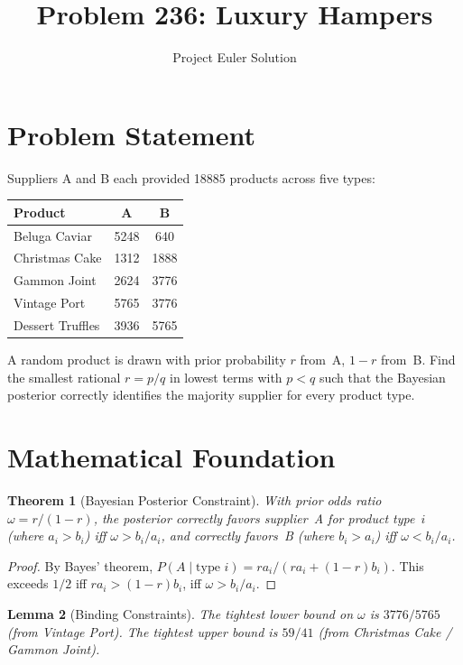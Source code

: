 \documentclass[12pt]{article}
\title{Problem 236: Luxury Hampers}
\author{Project Euler Solution}
\date{}
\newtheorem{theorem}{Theorem}
\newtheorem{lemma}[theorem]{Lemma}
\begin{document}
\maketitle

\section{Problem Statement}
Suppliers A and B each provided 18885 products across five types:

\begin{center}
\begin{tabular}{|l|c|c|}
\hline
Product & A & B \\
\hline
Beluga Caviar & 5248 & 640 \\
Christmas Cake & 1312 & 1888 \\
Gammon Joint & 2624 & 3776 \\
Vintage Port & 5765 & 3776 \\
Dessert Truffles & 3936 & 5765 \\
\hline
\end{tabular}
\end{center}

A random product is drawn with prior probability $r$ from~A, $1{-}r$ from~B. Find the smallest rational $r = p/q$ in lowest terms with $p < q$ such that the Bayesian posterior correctly identifies the majority supplier for every product type.

\section{Mathematical Foundation}

\begin{theorem}[Bayesian Posterior Constraint]
With prior odds ratio $\omega = r/(1-r)$, the posterior correctly favors supplier~A for product type~$i$ (where $a_i > b_i$) iff $\omega > b_i/a_i$, and correctly favors~B (where $b_i > a_i$) iff $\omega < b_i/a_i$.
\end{theorem}

\begin{proof}
By Bayes' theorem, $P(A \mid \text{type } i) = r a_i / (r a_i + (1-r)b_i)$. This exceeds $1/2$ iff $r a_i > (1-r)b_i$, iff $\omega > b_i/a_i$.
\end{proof}

\begin{lemma}[Binding Constraints]
The tightest lower bound on $\omega$ is $3776/5765$ (from Vintage Port). The tightest upper bound is $59/41$ (from Christmas Cake / Gammon Joint).
\end{lemma}
\end{document}
